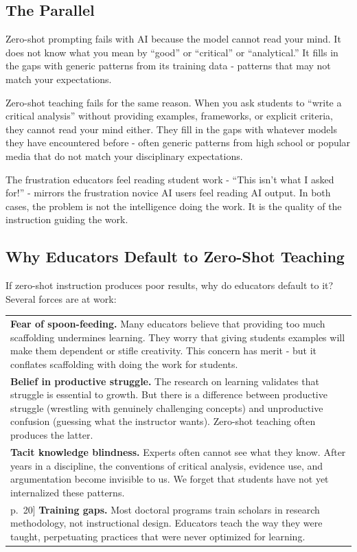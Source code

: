 \documentclass[
  letterpaper,
  DIV=11,
  numbers=noendperiod]{scrreprt}
\newcounter{none} %
\begin{document}
\subsection{The Parallel}\label{the-parallel}

Zero-shot prompting fails with AI because the model cannot read your
mind. It does not know what you mean by ``good'' or ``critical'' or
``analytical.'' It fills in the gaps with generic patterns from its
training data - patterns that may not match your expectations.

Zero-shot teaching fails for the same reason. When you ask students to
``write a critical analysis'' without providing examples, frameworks, or
explicit criteria, they cannot read your mind either. They fill in the
gaps with whatever models they have encountered before - often generic
patterns from high school or popular media that do not match your
disciplinary expectations.

The frustration educators feel reading student work - ``This isn't what
I asked for!'' - mirrors the frustration novice AI users feel reading AI
output. In both cases, the problem is not the intelligence doing the
work. It is the quality of the instruction guiding the work.

\subsection{Why Educators Default to Zero-Shot
Teaching}\label{why-educators-default-to-zero-shot-teaching}

If zero-shot instruction produces poor results, why do educators default
to it? Several forces are at work:

{\def\LTcaptype{none} %
\begin{longtable}[]{@{}
  >{\raggedright\arraybackslash}p{}@{}}
\toprule\noalign{}
\endhead
\bottomrule\noalign{}
\endlastfoot
\textbf{Fear of spoon-feeding.} Many educators believe that providing
too much scaffolding undermines learning. They worry that giving
students examples will make them dependent or stifle creativity. This
concern has merit - but it conflates scaffolding with doing the work for
students. \\
\textbf{Belief in productive struggle.} The research on learning
validates that struggle is essential to growth. But there is a
difference between productive struggle (wrestling with genuinely
challenging concepts) and unproductive confusion (guessing what the
instructor wants). Zero-shot teaching often produces the latter. \\
\textbf{Tacit knowledge blindness.} Experts often cannot see what they
know. After years in a discipline, the conventions of critical analysis,
evidence use, and argumentation become invisible to us. We forget that
students have not yet internalized these patterns. \\
{[}p.~20{]} \textbf{Training gaps.} Most doctoral programs train
scholars in research methodology, not instructional design. Educators
teach the way they were taught, perpetuating practices that were never
optimized for learning. \\
\end{longtable}
}
\end{document}
